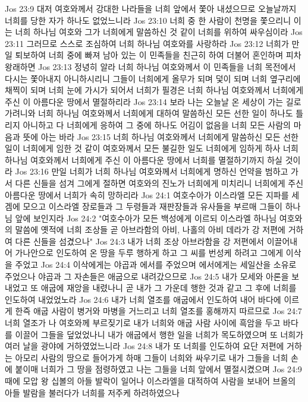 Jos 23:9  대저 여호와께서 강대한 나라들을 너희 앞에서 쫓아 내셨으므로 오늘날까지 너희를 당한 자가 하나도 없었느니라
Jos 23:10  너희 중 한 사람이 천명을 쫓으리니 이는 너희 하나님 여호와 그가 너희에게 말씀하신 것 같이 너희를 위하여 싸우심이라
Jos 23:11  그러므로 스스로 조심하여 너희 하나님 여호와를 사랑하라
Jos 23:12  너희가 만일 퇴보하여 너희 중에 빠져 남아 있는 이 민족들을 친근히 하여 더불어 혼인하며 피차 왕래하면
Jos 23:13  정녕히 알라 너희 하나님 여호와께서 이 민족들을 너희 목전에서 다시는 쫓아내지 아니하시리니 그들이 너희에게 올무가 되며 덫이 되며 너희 옆구리에 채찍이 되며 너희 눈에 가시가 되어서 너희가 필경은 너희 하나님 여호와께서 너희에게 주신 이 아름다운 땅에서 멸절하리라
Jos 23:14  보라 나는 오늘날 온 세상이 가는 길로 가려니와 너희 하나님 여호와께서 너희에게 대하여 말씀하신 모든 선한 일이 하나도 틀리지 아니하고 다 너희에게 응하여 그 중에 하나도 어김이 없음을 너희 모든 사람의 마음과 뜻에 아는 바라
Jos 23:15  너희 하나님 여호와께서 너희에게 말씀하신 모든 선한 일이 너희에게 임한 것 같이 여호와께서 모든 불길한 일도 너희에게 임하게 하사 너희 하나님 여호와께서 너희에게 주신 이 아름다운 땅에서 너희를 멸절하기까지 하실 것이라
Jos 23:16  만일 너희가 너희 하나님 여호와께서 너희에게 명하신 언약을 범하고 가서 다른 신들을 섬겨 그에게 절하면 여호와의 진노가 너희에게 미치리니 너희에게 주신 아름다운 땅에서 너희가 속히 망하리라
Jos 24:1  여호수아가 이스라엘 모든 지파를 세겜에 모으고 이스라엘 장로들과 그 두령들과 재판장들과 유사들을 부르매 그들이 하나님 앞에 보인지라
Jos 24:2  "여호수아가 모든 백성에게 이르되 이스라엘 하나님 여호와의 말씀에 옛적에 너희 조상들 곧 아브라함의 아비, 나홀의 아비 데라가 강 저편에 거하여 다른 신들을 섬겼으나"
Jos 24:3  내가 너희 조상 아브라함을 강 저편에서 이끌어내어 가나안으로 인도하여 온 땅을 두루 행하게 하고 그 씨를 번성케 하려고 그에게 이삭을 주었고
Jos 24:4  이삭에게는 야곱과 에서를 주었으며 에서에게는 세일산을 소유로 주었으나 야곱과 그 자손들은 애굽으로 내려갔으므로
Jos 24:5  내가 모세와 아론을 보내었고 또 애굽에 재앙을 내렸나니 곧 내가 그 가운데 행한 것과 같고 그 후에 너희를 인도하여 내었었노라
Jos 24:6  내가 너희 열조를 애굽에서 인도하여 내어 바다에 이르게 한즉 애굽 사람이 병거와 마병을 거느리고 너희 열조를 홍해까지 따르므로
Jos 24:7  너희 열조가 나 여호와께 부르짖기로 내가 너희와 애굽 사람 사이에 흑암을 두고 바다를 이끌어 그들을 덮었었나니 내가 애굽에서 행한 일을 너희가 목도하였으며 또 너희가 여러 날을 광야에 거하였었느니라
Jos 24:8  내가 또 너희를 인도하여 요단 저편에 거하는 아모리 사람의 땅으로 들어가게 하매 그들이 너희와 싸우기로 내가 그들을 너희 손에 붙이매 너희가 그 땅을 점령하였고 나는 그들을 너희 앞에서 멸절시켰으며
Jos 24:9  때에 모압 왕 십볼의 아들 발락이 일어나 이스라엘을 대적하여 사람을 보내어 브올의 아들 발람을 불러다가 너희를 저주케 하려하였으나
